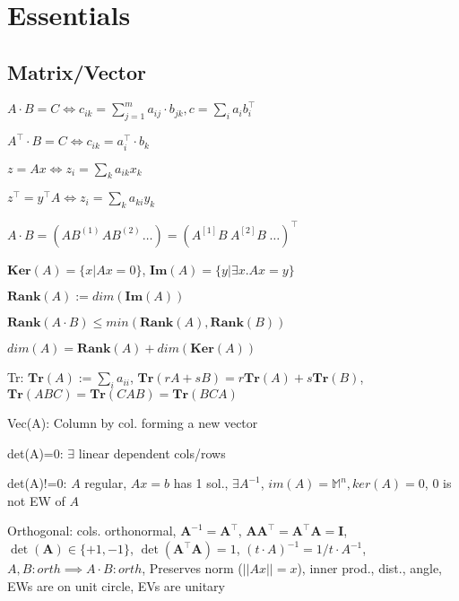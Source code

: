 \section{Essentials}
\subsection*{Matrix/Vector}
\begin{compactdesc}
	\item $A\cdot B = C \Leftrightarrow c_{ik}=\sum_{j=1}^{m} a_{ij} \cdot b_{jk}, c=\sum_{i} a_i b_i^\top$
	\item $A^\top\cdot B = C \Leftrightarrow c_{ik}=a_i^\top \cdot b_k$
	\item $z=Ax\Leftrightarrow z_i=\sum_k a_{ik} x_k$
	\item $z^\top = y^\top A \Leftrightarrow z_i = \sum_k a_{ki} y_k$
	\item $A\cdot B=(A B^{(1)}\hspace{1pt} AB^{(2)}\hspace{1pt} \dots)=(A^{[1]}B\hspace{3pt}A^{[2]}B\hspace{3pt}\dots)^\top$
	\item $\mathbf{Ker}(A)=\{x|Ax=0\}$, $\mathbf{Im}(A)=\{y|\exists x.Ax=y\}$
	\item $\mathbf{Rank}(A) := dim(\mathbf{Im}(A))$
	\item $\mathbf{Rank}(A\cdot B) \leq min(\mathbf{Rank}(A), \mathbf{Rank}(B))$
	\item $dim(A)=\mathbf{Rank}(A) + dim(\mathbf{Ker}(A))$
	\item[Tr:] $\mathbf{Tr}(A) := \sum_i a_{ii}$, $\mathbf{Tr}(rA+sB)=r\mathbf{Tr}(A)+s\mathbf{Tr}(B)$, $\mathbf{Tr}(ABC)=\mathbf{Tr}(CAB)=\mathbf{Tr}(BCA)$
	\item[Vec(A):] Column by col. forming a new vector
	\item[det(A)=0:] $\exists$ linear dependent cols/rows
	\item[det(A)!=0:] $A$ regular, $Ax=b$ has 1 sol., $\exists A^{-1}$, $im(A)=\mathbb{M}^n, ker(A)=0$, 0 is not EW of $A$
	\item[Orthogonal:] cols. orthonormal, $\mathbf{A}^{-1} = \mathbf{A}^\top$, $\mathbf{A} \mathbf{A}^\top = \mathbf{A}^\top \mathbf{A} = \mathbf{I}$, $\operatorname{det}(\mathbf{A}) \in \{+1, -1\}$, $\operatorname{det}(\mathbf{A}^\top \mathbf{A}) = 1$, $(t\cdot A)^{-1}=1/t\cdot A^{-1}$, $A, B: orth \implies A\cdot B: orth$, Preserves norm ($||Ax||=x$), inner prod., dist., angle, EWs are on unit circle, EVs are unitary

\end{compactdesc}
